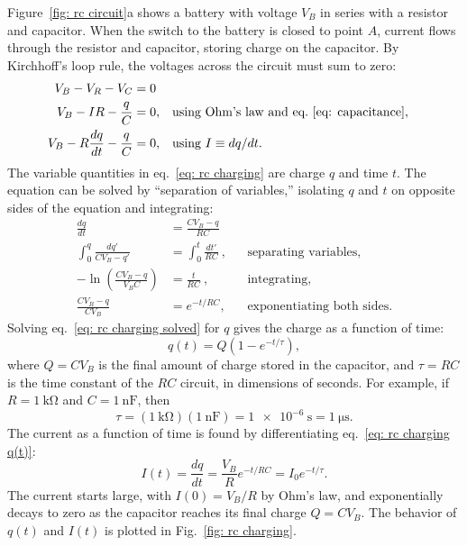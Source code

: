 \documentclass[addpoints]{physlabs}
\begin{document}
\begin{labsection}
\begin{theory}
    Figure~\ref{fig: rc circuit}a shows a battery with voltage $V_B$ in series with a resistor and capacitor. When the switch to the battery is closed to point $A$, current flows through the resistor and capacitor, storing charge on the capacitor. By Kirchhoff's loop rule, the voltages across the circuit must sum to zero:
    \begin{align}
        V_B - V_R - V_C &= 0 \nonumber
        \\
        V_B - IR - \frac{q}{C} &= 0, & &\text{using Ohm's law and eq.~\ref{eq: capacitance}}, \nonumber
        \\
        V_B - R\frac{dq}{dt} - \frac{q}{C} &= 0, & &\text{using $I\equiv dq/dt$.} \label{eq: rc charging}
    \end{align}
    The variable quantities in eq.~\ref{eq: rc charging} are charge $q$ and time $t$. The equation can be solved by ``separation of variables,'' isolating $q$ and $t$ on opposite sides of the equation and integrating:
    \begin{align}
        \frac{dq}{dt} &= \frac{CV_B -q}{RC} \nonumber
        \\
        \int_0^q \frac{dq'}{CV_B - q'} &= \int_0^t \frac{dt'}{RC}\ , & &\text{separating variables}, \nonumber
        \\
        -\ln{\left(\frac{CV_B - q}{V_BC}\right)} &= \frac{t}{RC}\ , & &\text{integrating}, \nonumber
        \\
        \frac{CV_B - q}{CV_B} &= e^{-t/RC}, & &\text{exponentiating both sides.} \label{eq: rc charging solved}
    \end{align}
    Solving eq.~\ref{eq: rc charging solved} for $q$ gives the charge as a function of time:
    \begin{equation}\label{eq: rc charging q(t)}
        q(t) = Q\left(1 - e^{-t/\tau}\right),
    \end{equation}
    where $Q=CV_B$ is the final amount of charge stored in the capacitor, and $\tau=RC$ is the time constant of the $RC$ circuit, in dimensions of seconds. For example, if $R=\qty{1}{\kilo\ohm}$ and $C=\qty{1}{\nano\farad}$, then
    \[
        \tau = (\qty{1}{\kilo\ohm})(\qty{1}{\nano\farad})  = \qty{1e-6}{\second} = \qty{1}{\micro\second}.
    \]
    The current as a function of time is found by differentiating eq.~\ref{eq: rc charging q(t)}:
    \begin{equation}\label{eq: rc charging I(t)}
        I(t) = \frac{dq}{dt} = \frac{V_B}{R} e^{-t/RC} = I_0 e^{-t/\tau}.
     \end{equation}
    The current starts large, with $I(0)=V_B/R$ by Ohm's law, and exponentially decays to zero as the capacitor reaches its final charge $Q = CV_B$. The behavior of $q(t)$ and $I(t)$ is plotted in Fig.~\ref{fig: rc charging}.


\end{theory}
\end{labsection}
\end{document}
